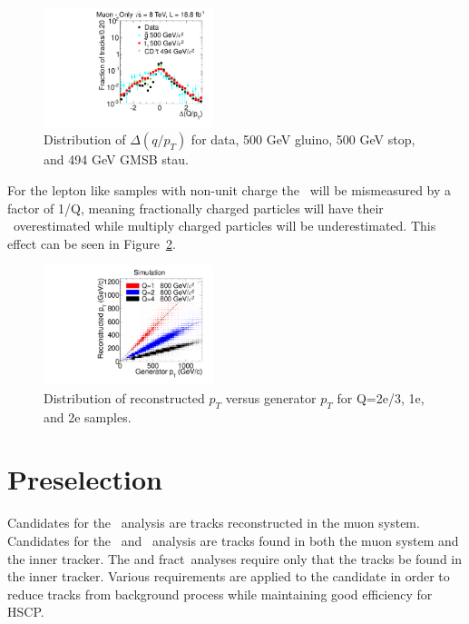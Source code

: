 \begin{figure}
 \begin{center}
  \includegraphics[width=0.44\textwidth]{figures/muonly/Selection_Comp_Signal_8TeV_InnerInvPtDiff_BS}
 \end{center}
 \caption{Distribution of $\Delta(q/p_T)$
    for data, 500 GeV gluino, 500 GeV stop, and 494 GeV
    GMSB stau.
    \label{fig:MuOnlyInvPtDiff}}
\end{figure}

For the lepton like samples with non-unit charge the \pt\ will be mismeasured by a factor of 1/Q, meaning fractionally charged particles will have their \pt\ overestimated
while multiply charged particles will be underestimated. This effect can be seen in Figure~\ref{fig:RecoGenPt}.

\begin{figure}
 \begin{center}
  \includegraphics[width=0.44\textwidth]{figures/tkonly/SIM_Validation_Pt.pdf}
 \end{center}
 \caption{Distribution of reconstructed $p_T$ versus generator $p_T$ for Q=2e/3, 1e, and 2e samples.
    \label{fig:RecoGenPt}}
\end{figure}

\section{Preselection \label{sec:preselection}}
Candidates for the \muononly\ analysis are tracks reconstructed in the muon system. Candidates for the \tktof\ and \multi\ analysis are tracks found in both the muon
system and the inner tracker. The \tkonly and fract\ analyses require only that the tracks be found in the inner tracker.
Various requirements are applied to the candidate in order to reduce tracks from background process while maintaining good efficiency for HSCP.

